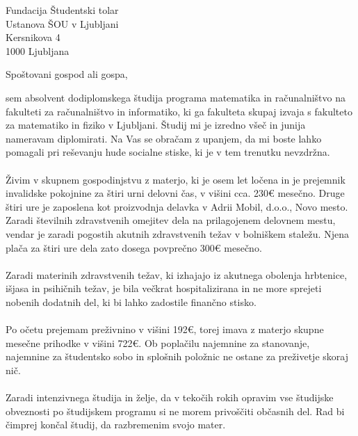 \documentclass[a4paper]{scrlttr2}
\begin{document}
 
\begin{letter}{Fundacija Študentski tolar \\ Ustanova ŠOU v Ljubljani \\ Kersnikova 4 \\ 1000 Ljubljana}
 

\opening{Spoštovani gospod ali gospa,}
sem absolvent dodiplomskega študija programa matematika in računalništvo na fakulteti za računalništvo in informatiko, ki ga fakulteta skupaj izvaja s fakulteto za matematiko in fiziko v Ljubljani. Študij mi je izredno všeč in junija nameravam diplomirati. Na Vas se obračam z upanjem, da mi boste lahko pomagali pri reševanju hude socialne stiske, ki je v tem trenutku nevzdržna.
\\
\\
Živim v skupnem gospodinjstvu z materjo, ki je osem let ločena in je prejemnik invalidske pokojnine za štiri urni delovni čas, v višini cca. 230\euro \hspace{1pt} mesečno. Druge štiri ure je zaposlena kot proizvodnja delavka v Adrii Mobil, d.o.o., Novo mesto. Zaradi številnih zdravstvenih omejitev dela na prilagojenem delovnem mestu, vendar je zaradi pogostih akutnih zdravstvenih težav v bolniškem staležu. Njena plača za štiri ure dela zato dosega povprečno 300\euro \hspace{1pt} mesečno. 
\\
\\
Zaradi materinih zdravstvenih težav, ki izhajajo iz akutnega obolenja hrbtenice, išjasa in psihičnih težav, je bila večkrat hospitalizirana in ne more sprejeti nobenih dodatnih del, ki bi lahko zadostile finančno stisko.
\\
\\
Po očetu prejemam preživnino v višini 192\euro, torej imava z materjo skupne mesečne prihodke v višini 722\euro. Ob poplačilu najemnine za stanovanje, najemnine za študentsko sobo in splošnih položnic ne ostane za preživetje skoraj nič. 
\\
\\
Zaradi intenzivnega študija in želje, da v tekočih rokih opravim vse študijske obveznosti po študijskem programu si ne morem privoščiti občasnih del. Rad bi čimprej končal študij, da razbremenim svojo mater.
\\
\\


\end{letter}
\end{document}
